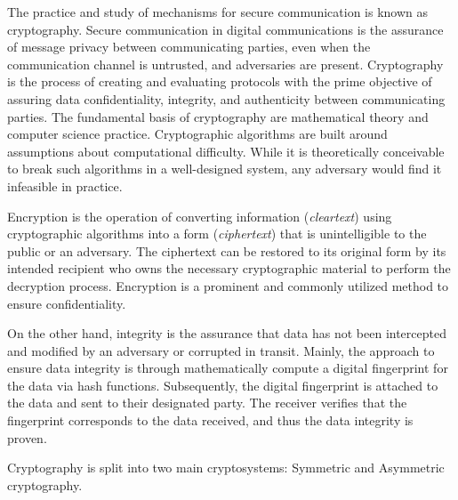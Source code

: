 The practice and study of mechanisms for secure communication is known as cryptography. Secure communication in digital communications is the assurance of message privacy between communicating parties, even when the communication channel is untrusted, and adversaries are present. Cryptography is the process of creating and evaluating protocols with the prime objective of assuring data confidentiality, integrity, and authenticity between communicating parties. The fundamental basis of cryptography are mathematical theory and computer science practice. Cryptographic algorithms are built around assumptions about computational difficulty. While it is theoretically conceivable to break such algorithms in a well-designed system, any adversary would find it infeasible in practice.
\par
Encryption is the operation of converting information (\textit{cleartext}) using cryptographic algorithms into a form (\textit{ciphertext}) that is unintelligible to the public or an adversary. The ciphertext can be restored to its original form by its intended recipient who owns the necessary cryptographic material to perform the decryption process. Encryption is a prominent and commonly utilized method to ensure confidentiality.
\par
On the other hand, integrity is the assurance that data has not been intercepted and modified by an adversary or corrupted in transit. Mainly, the approach to ensure data integrity is through mathematically compute a digital fingerprint for the data via hash functions. Subsequently, the digital fingerprint is attached to the data and sent to their designated party. The receiver verifies that the fingerprint corresponds to the data received, and thus the data integrity is proven.
\par
Cryptography is split into two main cryptosystems: Symmetric and Asymmetric cryptography.

